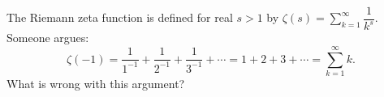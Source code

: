The Riemann zeta function is defined for real $s>1$ by $\zeta(s)=\sum_{k=1}^{\infty}\dfrac{1}{k^s}$. Someone argues:
\[
\zeta(-1)=\dfrac{1}{1^{-1}}+\dfrac{1}{2^{-1}}+\dfrac{1}{3^{-1}}+\cdots=1+2+3+\cdots=\sum_{k=1}^{\infty}k .
\]
What is wrong with this argument?
